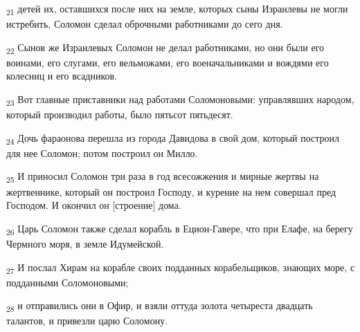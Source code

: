 \begin{tcolorbox}
\textsubscript{21} детей их, оставшихся после них на земле, которых сыны Израилевы не могли истребить, Соломон сделал оброчными работниками до сего дня.
\end{tcolorbox}
\begin{tcolorbox}
\textsubscript{22} Сынов же Израилевых Соломон не делал работниками, но они были его воинами, его слугами, его вельможами, его военачальниками и вождями его колесниц и его всадников.
\end{tcolorbox}
\begin{tcolorbox}
\textsubscript{23} Вот главные приставники над работами Соломоновыми: управлявших народом, который производил работы, было пятьсот пятьдесят.
\end{tcolorbox}
\begin{tcolorbox}
\textsubscript{24} Дочь фараонова перешла из города Давидова в свой дом, который построил для нее Соломон; потом построил он Милло.
\end{tcolorbox}
\begin{tcolorbox}
\textsubscript{25} И приносил Соломон три раза в год всесожжения и мирные жертвы на жертвеннике, который он построил Господу, и курение на нем совершал пред Господом. И окончил он [строение] дома.
\end{tcolorbox}
\begin{tcolorbox}
\textsubscript{26} Царь Соломон также сделал корабль в Ецион-Гавере, что при Елафе, на берегу Чермного моря, в земле Идумейской.
\end{tcolorbox}
\begin{tcolorbox}
\textsubscript{27} И послал Хирам на корабле своих подданных корабельщиков, знающих море, с подданными Соломоновыми;
\end{tcolorbox}
\begin{tcolorbox}
\textsubscript{28} и отправились они в Офир, и взяли оттуда золота четыреста двадцать талантов, и привезли царю Соломону.
\end{tcolorbox}

